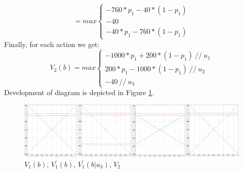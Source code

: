 \documentclass[english]{scrartcl}
\begin{document}
  \[
     =max\left\{
                \begin{array}{ll}
                  -760*p_1-40*(1-p_1)\\
                  -40\\
                  -40*p_1-760*(1-p_1)
                \end{array}
              \right.
  \]
Finally, for each action we get:
\[
     V_2(b)=max\left\{
                \begin{array}{ll}
                  -1000*p_1+200*(1-p_1) \ // \ u_1\\
                  200*p_1-1000*(1-p_1) \ // \ u_2\\
                  -40 \ // \ u_3
                \end{array}
              \right.
  \]
Development of diagram is depicted in Figure \ref{fig:v-development}.

\begin{figure}[h]
\centering
\includegraphics{./v-development}
\caption{$V_1(b)$, $V_1^\prime(b)$, $V_1^\prime(b|u_3)$, $V_2$}
\label{fig:v-development}
\end{figure}
\end{document}
